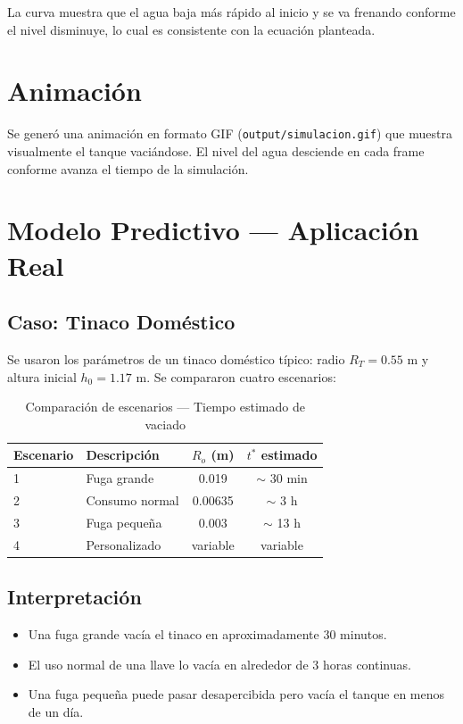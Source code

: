 \documentclass[12pt, a4paper]{article}
\begin{document}
La curva muestra que el agua baja más rápido al inicio y se va frenando
conforme el nivel disminuye, lo cual es consistente con la ecuación planteada.

\section{Animación}

Se generó una animación en formato GIF (\texttt{output/simulacion.gif}) que
muestra visualmente el tanque vaciándose. El nivel del agua desciende en cada
frame conforme avanza el tiempo de la simulación.

\section{Modelo Predictivo — Aplicación Real}

\subsection{Caso: Tinaco Doméstico}

Se usaron los parámetros de un tinaco doméstico típico: radio $R_T = 0.55$ m
y altura inicial $h_0 = 1.17$ m. Se compararon cuatro escenarios:

\begin{table}[H]
    \centering
    \caption{Comparación de escenarios — Tiempo estimado de vaciado}
    \begin{tabular}{llcc}
        \toprule
        \textbf{Escenario} & \textbf{Descripción} & $R_o$ (m) & $t^*$ estimado \\
        \midrule
        1 & Fuga grande    & 0.019    & $\sim$ 30 min \\
        2 & Consumo normal & 0.00635  & $\sim$ 3 h    \\
        3 & Fuga pequeña   & 0.003    & $\sim$ 13 h   \\
        4 & Personalizado  & variable & variable      \\
        \bottomrule
    \end{tabular}
\end{table}

\subsection{Interpretación}

\begin{itemize}
    \item Una fuga grande vacía el tinaco en aproximadamente 30 minutos.
    \item El uso normal de una llave lo vacía en alrededor de 3 horas continuas.
    \item Una fuga pequeña puede pasar desapercibida pero vacía el tanque en menos de un día.
\end{itemize}
\end{document}
